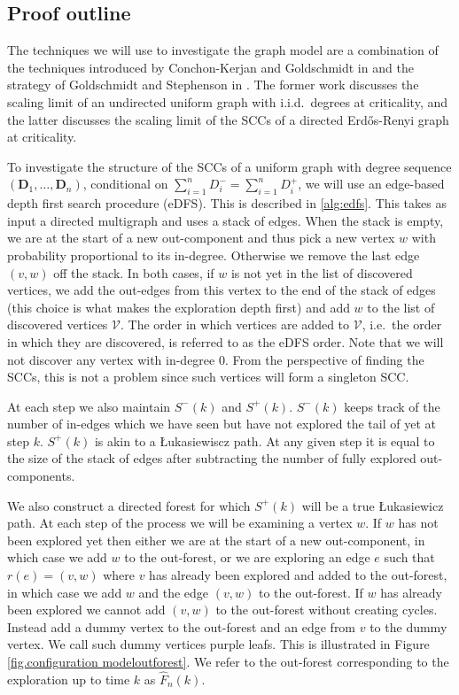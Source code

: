 \subsection{Proof outline}

\def \exploredvertices {\mathcal V}
\def \explorededges {\mathcal E}
\def \forest {F}
\def \edgestack {\mathcal Q}

The techniques we will use to investigate the graph model are a combination of the techniques introduced by Conchon-Kerjan and Goldschmidt in \cite{conchon--kerjanStableGraphMetric2020} and the strategy of Goldschmidt and Stephenson in \cite{goldschmidtScalingLimitCritical2019}. The former work discusses the scaling limit of an undirected uniform graph with i.i.d.\ degrees at criticality, and the latter discusses the scaling limit of the SCCs of a directed Erd\H{o}s-Renyi graph at criticality.

To investigate the structure of the SCCs of a uniform graph with degree sequence $(\mathbf{D}_1,\dots,\mathbf{D}_n)$, conditional on $\sum_{i=1}^n D^-_i=\sum_{i=1}^n D^+_i$, we will use an edge-based depth first search procedure (eDFS). This is described in \cref{alg:edfs}. This takes as input a directed multigraph and uses a stack of edges. When the stack is empty, we are at the start of a new out-component and thus pick a new vertex $w$ with probability proportional to its in-degree. Otherwise we remove the last edge $(v, w)$ off the stack. In both cases, if $w$ is not yet in the list of discovered vertices, we add the out-edges from this vertex to the end of the stack of edges (this choice is what makes the exploration depth first) and add $w$ to the list of discovered vertices $\exploredvertices$.  The order in which vertices are added to $\exploredvertices$, i.e.\ the order in which they are discovered, is referred to as the eDFS order. Note that we will not discover any vertex with in-degree 0. From the perspective of finding the SCCs, this is not a problem since such vertices will form a singleton SCC.

At each step we also maintain $S^-(k)$ and $S^+(k)$. $S^-(k)$ keeps track of the number of in-edges which we have seen but have not explored the tail of yet at step $k$. $S^+(k)$ is akin to a \L{}ukasiewiscz path. At any given step it is equal to the size of the stack of edges after subtracting the number of fully explored out-components.

We also construct a directed forest for which $S^+(k)$ will be a true \L{}ukasiewicz path. At each step of the process we will be examining a vertex $w$. If $w$ has not been explored yet then either we are at the start of a new out-component, in which case we add $w$ to the out-forest, or we are exploring an edge $e$ such that $r(e) = (v, w)$ where $v$ has already been explored and added to the out-forest, in which case we add $w$ and the edge $(v, w)$ to the out-forest. If $w$ has already been explored we cannot add $(v, w)$ to the out-forest without creating cycles. Instead add a dummy vertex to the out-forest and an edge from $v$ to the dummy vertex. We call such dummy vertices purple leafs. This is illustrated in Figure \ref{fig.configuration modeloutforest}. We refer to the out-forest corresponding to the exploration up to time $k$ as $\hat{F}_n(k)$.

